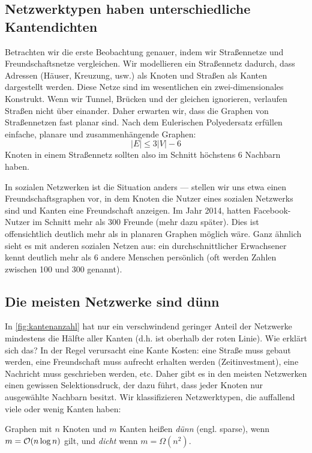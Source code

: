 \subsection{Netzwerktypen haben unterschiedliche Kantendichten}
Betrachten wir die erste Beobachtung genauer, indem wir Straßennetze und Freundschaftsnetze vergleichen.
Wir modellieren ein Straßennetz dadurch, dass Adressen (Häuser, Kreuzung, usw.) als Knoten und Straßen als Kanten dargestellt werden.
Diese Netze  sind im wesentlichen ein zwei-dimensionales Konstrukt.
Wenn wir Tunnel, Brücken und der gleichen ignorieren, verlaufen Straßen nicht über einander.
Daher erwarten wir, dass die Graphen von Straßennetzen fast planar sind.
Nach dem Eulerischen Polyedersatz erfüllen einfache,  planare und zusammenhängende Graphen:
\begin{equation}
    |E| \le 3 |V| - 6
\end{equation}
Knoten in einem Straßennetz sollten also im Schnitt höchstens 6 Nachbarn haben.

In  sozialen Netzwerken ist die Situation anders ---
stellen wir uns etwa einen Freundschaftsgraphen vor, in dem Knoten die Nutzer eines sozialen Netzwerks sind und Kanten eine Freundschaft anzeigen.
Im Jahr 2014, hatten Facebook-Nutzer im Schnitt mehr als 300 Freunde (mehr dazu später).
Dies ist offensichtlich deutlich mehr als in planaren Graphen möglich wäre.
Ganz ähnlich sieht es mit anderen sozialen Netzen aus: ein durchschnittlicher Erwachsener kennt deutlich mehr als 6 andere Menschen persönlich (oft werden Zahlen zwischen 100 und 300 genannt).

\subsection{Die meisten Netzwerke sind dünn}
In \cref{fig:kantenanzahl} hat nur ein verschwindend geringer Anteil der Netzwerke mindestens die Hälfte aller Kanten (d.h. ist oberhalb der roten Linie).
Wie erklärt sich das?
In der Regel verursacht eine Kante Kosten:
eine Straße muss gebaut werden, eine Freundschaft muss aufrecht erhalten werden (Zeitinvestment), eine Nachricht muss geschrieben werden, etc.
Daher gibt es in den meisten Netzwerken einen gewissen Selektionsdruck, der dazu führt, dass jeder Knoten nur ausgewählte Nachbarn besitzt.
Wir klassifizieren Netzwerktypen, die auffallend viele oder wenig Kanten haben:

\begin{definition}
    Graphen  mit $n$ Knoten und $m$ Kanten heißen \emph{dünn} (engl. sparse), wenn $m = \mathcal{O}\!\left(n \log n\right)$ gilt, und \emph{dicht} wenn $m = \Omega(n^2)$.
\end{definition}

